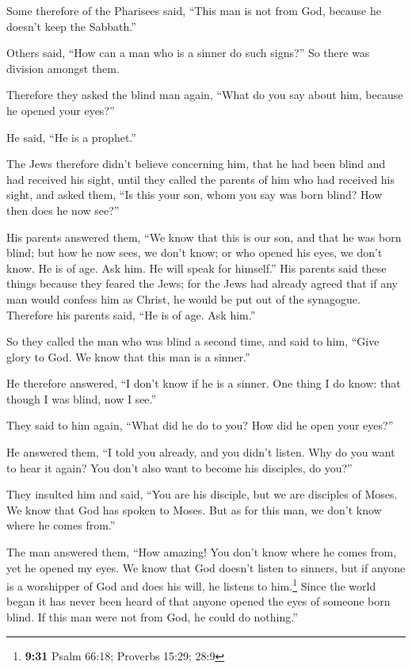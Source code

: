  Some therefore of the Pharisees said, ``This man is not
from God, because he doesn't keep the Sabbath.''

Others said, ``How can a man who is a sinner do such signs?'' So there
was division amongst them.

 Therefore they asked the blind man again, ``What do you
say about him, because he opened your eyes?''

He said, ``He is a prophet.''

 The Jews therefore didn't believe concerning him, that
he had been blind and had received his sight, until they called the
parents of him who had received his sight,  and asked
them, ``Is this your son, whom you say was born blind? How then does he
now see?''

 His parents answered them, ``We know that this is our
son, and that he was born blind;  but how he now sees, we
don't know; or who opened his eyes, we don't know. He is of age. Ask
him. He will speak for himself.''  His parents said these
things because they feared the Jews; for the Jews had already agreed
that if any man would confess him as Christ, he would be put out of the
synagogue.  Therefore his parents said, ``He is of age.
Ask him.''

 So they called the man who was blind a second time, and
said to him, ``Give glory to God. We know that this man is a sinner.''

 He therefore answered, ``I don't know if he is a sinner.
One thing I do know: that though I was blind, now I see.''

 They said to him again, ``What did he do to you? How did
he open your eyes?''

 He answered them, ``I told you already, and you didn't
listen. Why do you want to hear it again? You don't also want to become
his disciples, do you?''

 They insulted him and said, ``You are his disciple, but
we are disciples of Moses.  We know that God has spoken
to Moses. But as for this man, we don't know where he comes from.''

 The man answered them, ``How amazing! You don't know
where he comes from, yet he opened my eyes.  We know that
God doesn't listen to sinners, but if anyone is a worshipper of God and
does his will, he listens to him.\footnote{\textbf{9:31} Psalm 66:18;
  Proverbs 15:29; 28:9}  Since the world began it has
never been heard of that anyone opened the eyes of someone born blind.
 If this man were not from God, he could do nothing.''

